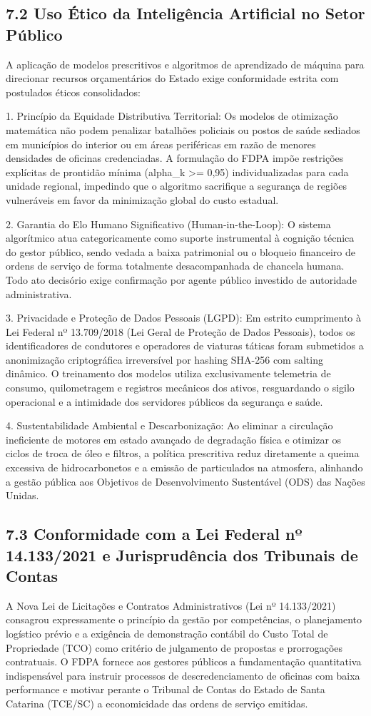 \documentclass[10pt,a4paper,journal]{article}
\begin{document}
\subsection{7.2 Uso Ético da Inteligência Artificial no Setor Público}
A aplicação de modelos prescritivos e algoritmos de aprendizado de máquina para direcionar recursos orçamentários do Estado exige conformidade estrita com postulados éticos consolidados:

1. Princípio da Equidade Distributiva Territorial: Os modelos de otimização matemática não podem penalizar batalhões policiais ou postos de saúde sediados em municípios do interior ou em áreas periféricas em razão de menores densidades de oficinas credenciadas. A formulação do FDPA impõe restrições explícitas de prontidão mínima (alpha\_k >= 0,95) individualizadas para cada unidade regional, impedindo que o algoritmo sacrifique a segurança de regiões vulneráveis em favor da minimização global do custo estadual.

2. Garantia do Elo Humano Significativo (Human-in-the-Loop): O sistema algorítmico atua categoricamente como suporte instrumental à cognição técnica do gestor público, sendo vedada a baixa patrimonial ou o bloqueio financeiro de ordens de serviço de forma totalmente desacompanhada de chancela humana. Todo ato decisório exige confirmação por agente público investido de autoridade administrativa.

3. Privacidade e Proteção de Dados Pessoais (LGPD): Em estrito cumprimento à Lei Federal nº 13.709/2018 (Lei Geral de Proteção de Dados Pessoais), todos os identificadores de condutores e operadores de viaturas táticas foram submetidos a anonimização criptográfica irreversível por hashing SHA-256 com salting dinâmico. O treinamento dos modelos utiliza exclusivamente telemetria de consumo, quilometragem e registros mecânicos dos ativos, resguardando o sigilo operacional e a intimidade dos servidores públicos da segurança e saúde.

4. Sustentabilidade Ambiental e Descarbonização: Ao eliminar a circulação ineficiente de motores em estado avançado de degradação física e otimizar os ciclos de troca de óleo e filtros, a política prescritiva reduz diretamente a queima excessiva de hidrocarbonetos e a emissão de particulados na atmosfera, alinhando a gestão pública aos Objetivos de Desenvolvimento Sustentável (ODS) das Nações Unidas.

\subsection{7.3 Conformidade com a Lei Federal nº 14.133/2021 e Jurisprudência dos Tribunais de Contas}
A Nova Lei de Licitações e Contratos Administrativos (Lei nº 14.133/2021) consagrou expressamente o princípio da gestão por competências, o planejamento logístico prévio e a exigência de demonstração contábil do Custo Total de Propriedade (TCO) como critério de julgamento de propostas e prorrogações contratuais. O FDPA fornece aos gestores públicos a fundamentação quantitativa indispensável para instruir processos de descredenciamento de oficinas com baixa performance e motivar perante o Tribunal de Contas do Estado de Santa Catarina (TCE/SC) a economicidade das ordens de serviço emitidas.
\end{document}
